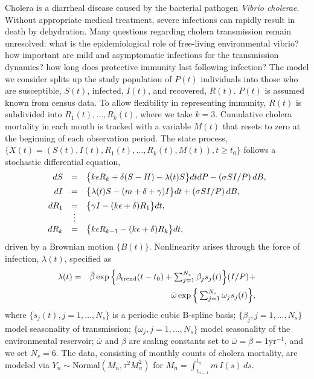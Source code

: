 \documentclass{pnastwo}\usepackage[]{graphicx}\usepackage[]{color}
\begin{document}
\begin{article}
Cholera is a diarrheal disease caused by the bacterial pathogen {\it Vibrio cholerae}. 
Without appropriate medical treatment, severe infections can rapidly result in death by dehydration.
Many questions regarding cholera transmission remain unresolved:
what is the epidemiological role of free-living environmental vibrio?
how important are mild and asymptomatic infections for the transmission dynamics?
how long does protective immunity last following infection?
The model we consider splits up the study population of $P(t)$ individuals into those who are susceptible, $S(t)$, infected, $I(t)$, and recovered, $R(t)$. 
$P(t)$ is assumed known from census data.
To allow flexibility in representing immunity, $R(t)$ is subdivided into $R_1(t), \dots, R_k(t)$, where we take $k=3$.
Cumulative cholera mortality in each month is tracked with a variable $M(t)$ that resets to zero at the beginning of each observation period.
The state process, $\{X(t)=(S(t),I(t),R_1(t),\dots,R_k(t), M(t)),t\ge t_0\}$ follows a stochastic differential equation,
\begin{equation} \nonumber
\begin{array}{rcl}dS &=& \rule[-3mm]{0mm}{5mm} \big\{ k \epsilon R_k + \delta(S-H) - \lambda(t)S \big\} dt
dP - (\sigma SI/P)\, dB,
\\
dI &=& \rule[-3mm]{0mm}{5mm} \big\{\lambda(t)S - (m+\delta+\gamma)I\big\} dt + (\sigma SI/P)\, dB,
\\
dR_1 &=& 
\big\{\gamma I - ( k\epsilon + \delta) R_1 \big\} dt,
\vspace{-1mm}
\\
&\vspace{0mm}\vdots&
\\
dR_k &=& \big\{k\epsilon R_{k-1} - (k\epsilon + \delta)R_k\big\} dt,
\end{array}
\end{equation}
 driven by a Brownian motion $\{B(t)\}$. Nonlinearity arises through the force of infection, $\lambda(t)$, specified as
\begin{eqnarray}\nonumber
\lambda(t)&=&  \bar\beta \exp\Big\{\beta_{\mathrm{trend}} (t-t_0) + \textstyle \sum_{j=1}^{N_s} \beta_js_j(t)\Big\} (I/P) +
\\
&& \hspace{15mm}  \nonumber
\bar\omega\exp\Big\{\textstyle \sum_{j=1}^{N_s} \omega_js_j(t)\Big\}, 
\end{eqnarray}
where $\{s_j(t),j=1,\dots,N_s\}$ is a periodic cubic B-spline basis;
$\{\beta_j,j=1,\dots,N_s\}$ model seasonality of transmission; $\{\omega_j,j=1,\dots,N_s\}$ model seasonality of the environmental reservoir; $\bar\omega$ and $\bar\beta$ are scaling constants set to $\bar\omega=\bar\beta=1 \mathrm{yr}^{-1}$, and we set $N_s=6$.
The data, consisting of monthly counts of cholera mortality, are modeled via $Y_n\sim \mathrm{Normal}(M_n,\tau^2 M_n^2)$ for $M_n=\int_{t_{n-1}}^{t_n} \! m\,I(s)\, ds$.




\end{article}
\end{document}
